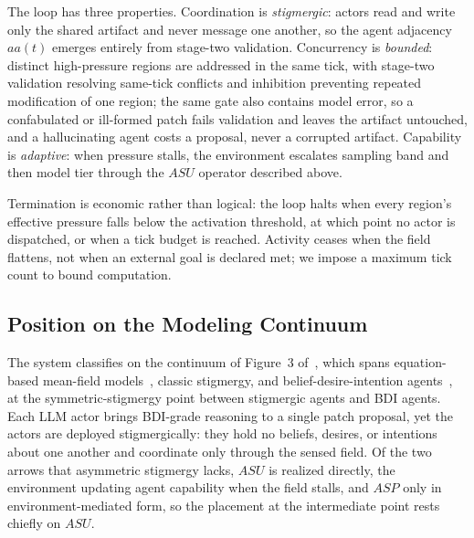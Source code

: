 The loop has three properties. Coordination is \emph{stigmergic}: actors read and write only the shared artifact and never message one another, so the agent adjacency $aa(t)$ emerges entirely from stage-two validation. Concurrency is \emph{bounded}: distinct high-pressure regions are addressed in the same tick, with stage-two validation resolving same-tick conflicts and inhibition preventing repeated modification of one region; the same gate also contains model error, so a confabulated or ill-formed patch fails validation and leaves the artifact untouched, and a hallucinating agent costs a proposal, never a corrupted artifact. Capability is \emph{adaptive}: when pressure stalls, the environment escalates sampling band and then model tier through the $ASU$ operator described above.

Termination is economic rather than logical: the loop halts when every region's effective pressure falls below the activation threshold, at which point no actor is dispatched, or when a tick budget is reached. Activity ceases when the field flattens, not when an external goal is declared met; we impose a maximum tick count to bound computation.

\subsection{Position on the Modeling Continuum}

The system classifies on the continuum of Figure~3 of~\cite{parunak2025insects}, which spans equation-based mean-field models~\cite{parunak2011mean}, classic stigmergy, and belief-desire-intention agents~\cite{bratman1987intentions,raogeorgeff1995bdi}, at the symmetric-stigmergy point between stigmergic agents and BDI agents. Each LLM actor brings BDI-grade reasoning to a single patch proposal, yet the actors are deployed stigmergically: they hold no beliefs, desires, or intentions about one another and coordinate only through the sensed field. Of the two arrows that asymmetric stigmergy lacks, $ASU$ is realized directly, the environment updating agent capability when the field stalls, and $ASP$ only in environment-mediated form, so the placement at the intermediate point rests chiefly on $ASU$.
